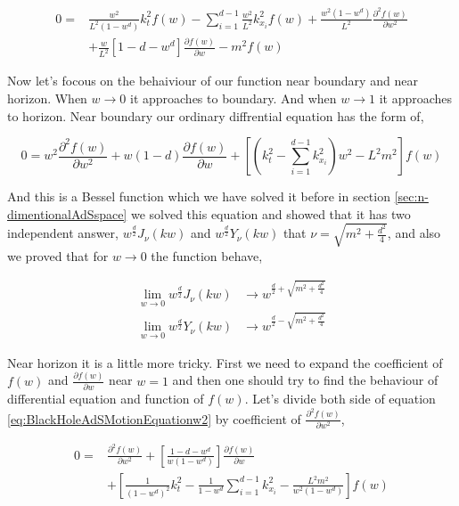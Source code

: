 \begin{align} \label{eq:BlackHoleAdSMotionEquationw2}
   0 =& \frac{w^2}{L^2(1-w^d)}k^2_t f(w) - \sum\limits_{i=1}^{d-1}\frac{w^2}{L^2}k^2_{x_i} f(w) + \frac{w^2 (1-w^d)}{L^2}\frac{\partial^2 f(w)}{\partial w^2} \nonumber\\
   & + \frac{w}{L^2} \left[ 1-d -w^d  \right] \frac{\partial f(w)}{\partial w} - m^2 f(w)
\end{align}

Now let's focous on the behaiviour of our function near boundary and near horizon. When $w \rightarrow 0$ it approaches to boundary. And when $w \rightarrow 1$ it approaches to horizon. Near boundary our ordinary diffrential equation has the form of,

\begin{equation} 
   0 = w^2\frac{\partial^2 f(w)}{\partial w^2} + w(1-d)\frac{\partial f(w)}{\partial w} + \left[(k^2_t - \sum\limits_{i=1}^{d-1}k^2_{x_i})w^2 - L^2 m^2 \right] f(w)
\end{equation}

And this is a Bessel function which we have solved it before in section \ref{sec:n-dimentionalAdSspace} we solved this equation and showed that it has two independent answer, $w^{\frac{d}{2}}J_{\nu}(kw)$ and $w^{\frac{d}{2}}Y_{\nu}(kw)$ that $\nu = \sqrt{m^2 + \frac{d^2}{4}} $, and also we proved that for $w \rightarrow 0$ the function behave,

\begin{align}
    \lim\limits_{w\rightarrow 0} w^{\frac{d}{2}}J_{\nu}(kw) &\rightarrow w^{\frac{d}{2}+\sqrt{m^2 + \frac{d^2}{4}}} \\
    \lim\limits_{w\rightarrow 0} w^{\frac{d}{2}}Y_{\nu}(kw) &\rightarrow w^{\frac{d}{2}-\sqrt{m^2 + \frac{d^2}{4}}}
\end{align}

Near horizon it is a little more tricky. First we need to expand the coefficient of $f(w)$ and $\frac{\partial f(w)}{\partial w}$ near $w=1$ and then one should try to find the behaviour of differential equation and function of $f(w)$. Let's divide both side of equation \ref{eq:BlackHoleAdSMotionEquationw2} by coefficient of $\frac{\partial^2 f(w)}{\partial w^2}$,

\begin{align}
   0 =& \frac{\partial^2f(w)}{\partial w^2} + \left[\frac{1-d-w^d}{w(1-w^d)}\right]\frac{\partial f(w)}{\partial w} \\
   & + \left[ \frac{1}{(1-w^d)^2}k^2_t - \frac{1}{1-w^d}\sum\limits_{i=1}^{d-1}k^2_{x_i} - \frac{L^2m^2}{w^2(1-w^d)}\right] f(w) \nonumber
\end{align}

